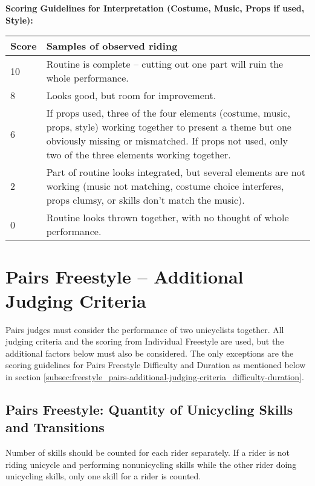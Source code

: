 \begin{minipage}{\textwidth}
\textbf{Scoring Guidelines for Interpretation (Costume, Music, Props if used, Style):} \\

\begin{tabular}{|l|p{12.5cm}|}
\hline
\textbf{Score} & \textbf{Samples of observed riding} \\
\hline
10 & Routine is complete – cutting out one part will ruin the whole performance. \\
\hline
8 & Looks good, but room for improvement. \\
\hline
6 & If props used, three of the four elements (costume, music, props, style) working together to present a theme but one obviously missing or mismatched.
If props not used, only two of the three elements working together. \\
\hline
2 & Part of routine looks integrated, but several elements are not working (music not matching, costume choice interferes, props clumsy, or skills don't match the music). \\
\hline
0 & Routine looks thrown together, with no thought of whole performance. \\
\hline
\end{tabular}
\end{minipage}

\section{Pairs Freestyle – Additional Judging Criteria}
Pairs judges must consider the performance of two unicyclists together.
All judging criteria and the scoring from Individual Freestyle are used, but the additional factors below must also be considered.
The only exceptions are the scoring guidelines for Pairs Freestyle Difficulty and Duration as mentioned below in section \ref{subsec:freestyle_pairs-additional-judging-criteria_difficulty-duration}.

\subsection{Pairs Freestyle: Quantity of Unicycling Skills and Transitions \label{subsec:freestyle_pairs-additional-judging-criteria_quantity}}
Number of skills should be counted for each rider separately.
If a rider is not riding unicycle and performing nonunicycling skills while the other rider doing unicycling skills, only one skill for a rider is counted.


